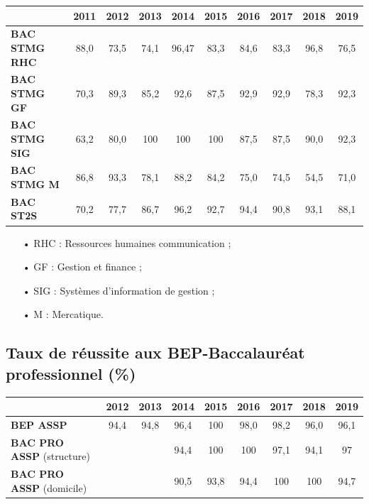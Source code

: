 \documentclass[12pt,a4paper, fleqn]{report}
\begin{document}
\begin{center}
\begin{tabular}{l|c|c|c|c|c|c|c|c|c}
		& \textbf{2011} & \textbf{2012} & \textbf{2013} & \textbf{2014} & \textbf{2015} & \textbf{2016} & \textbf{2017} & \textbf{2018} & \textbf{2019} \\
\hline \hline
\textbf{BAC STMG RHC} 		& 88{,}0 & 73{,}5 & 74{,}1 & 96{,}47 & 83{,}3 & 84{,}6 & 83{,}3 & 96{,}8 & 76{,}5 \\
\hline
\textbf{BAC STMG GF}  & 70{,}3 & 89{,}3 & 85{,}2 & 92{,}6 & 87{,}5 & 92{,}9 & 92{,}9 & 78{,}3 & 92{,}3 \\
\hline
\textbf{BAC STMG SIG}		& 63{,}2 & 80{,}0 & 100 & 100 & 100 & 87{,}5 & 87{,}5 & 90{,}0 & 92{,}3 \\
\hline
\textbf{BAC STMG M} & 86{,}8 & 93{,}3 & 78{,}1 & 88{,}2 & 84{,}2 & 75{,}0 & 74{,}5 & 54{,}5 & 71{,}0 \\
\hline
\textbf{BAC ST2S} & 70{,}2 & 77{,}7 & 86{,}7 & 96{,}2 & 92{,}7 & 94{,}4 & 90{,}8 & 93{,}1 & 88{,}1 \\
\end{tabular}
\end{center}

\begin{itemize}
\item[•] RHC : Ressources humaines communication ;
\item[•] GF : Gestion et finance ;
\item[•] SIG : Systèmes d'information de gestion ;
\item[•] M : Mercatique.
\end{itemize}

\subsection{Taux de réussite aux BEP-Baccalauréat professionnel (\%)}

\begin{center}
\begin{tabular}{l|c|c|c|c|c|c|c|c}
		& \textbf{2012} & \textbf{2013} & \textbf{2014} & \textbf{2015} & \textbf{2016} & \textbf{2017} & \textbf{2018} & \textbf{2019} \\
\hline \hline
\textbf{BEP ASSP} 		& 94{,}4 & 94{,}8 & 96{,}4 & 100 & 98{,}0 & 98{,}2 & 96{,}0 & 96{,}1 \\
\hline
\textbf{BAC PRO ASSP} (structure) 	& & & 94{,}4 & 100 & 100 & 97{,}1 & 94{,}1 & 97 \\
\hline
\textbf{BAC PRO ASSP}	(domicile)	& & & 90{,}5 & 93{,}8 & 94{,}4 & 100 & 100 & 94{,}7 \\
\end{tabular}
\end{center}
\end{document}
